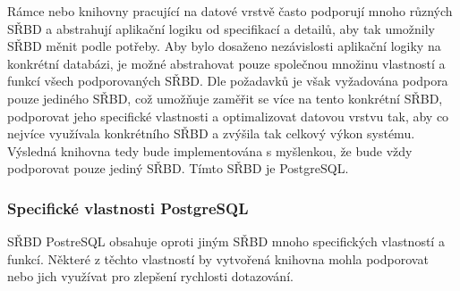 \documentclass[ing,male,java,dept456]{diploma}						%
\begin{document}
Rámce nebo knihovny pracující na datové vrstvě často podporují mnoho různých SŘBD a abstrahují aplikační logiku od specifikací a detailů, aby tak umožnily SŘBD měnit podle potřeby. Aby bylo dosaženo nezávislosti aplikační logiky na konkrétní databázi, je možné abstrahovat pouze společnou množinu vlastností a funkcí všech podporovaných SŘBD. Dle požadavků je však vyžadována podpora pouze jediného SŘBD, což umožňuje zaměřit se více na tento konkrétní SŘBD, podporovat jeho specifické vlastnosti a optimalizovat datovou vrstvu tak, aby co nejvíce využívala konkrétního SŘBD a zvýšila tak celkový výkon systému. \\
Výsledná knihovna tedy bude implementována s myšlenkou, že bude vždy podporovat pouze jediný SŘBD. Tímto SŘBD je PostgreSQL.

\subsubsection{Specifické vlastnosti PostgreSQL}

SŘBD PostreSQL obsahuje oproti jiným SŘBD mnoho specifických vlastností a funkcí. Některé z těchto vlastností by vytvořená knihovna mohla podporovat nebo jich využívat pro zlepšení rychlosti dotazování.
\end{document}
